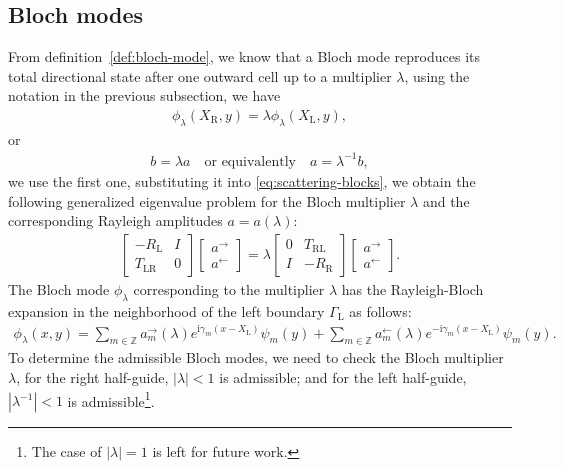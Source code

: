 \documentclass[11pt,fleqn]{article}
\newcommand{\ii}{\mathrm{i}}
\theoremstyle{definition}
\theoremstyle{remark}
\begin{document}
\subsection{Bloch modes}
From definition~\ref{def:bloch-mode}, we know that a Bloch mode reproduces its total directional state after one outward cell up to a multiplier $\lambda$, using the notation in the previous subsection, we have
\begin{align*}
  \phi_\lambda(X_\mathrm{R}, y) = \lambda \phi_\lambda(X_\mathrm{L},y),
\end{align*}
or \begin{align*}
  b = \lambda a \quad \text{or equivalently}\quad a = \lambda^{-1} b,
\end{align*}
we use the first one, substituting it into \eqref{eq:scattering-blocks}, we obtain
the following generalized eigenvalue problem for the Bloch multiplier $\lambda$ and the corresponding Rayleigh amplitudes $a = a(\lambda)$:
\begin{align}
  \begin{bmatrix}
    -R_\mathrm{L} & I \\ T_\mathrm{LR} & 0
  \end{bmatrix}\begin{bmatrix}
    a^\rightarrow \\ a^\leftarrow
  \end{bmatrix}
   = \lambda \begin{bmatrix}
    0 & T_\mathrm{RL} \\ I & -R_\mathrm{R}
  \end{bmatrix}\begin{bmatrix}
    a^\rightarrow \\ a^\leftarrow
  \end{bmatrix}.
\end{align}
The Bloch mode $\phi_\lambda$ corresponding to the multiplier $\lambda$ has the Rayleigh-Bloch expansion in the neighborhood of the left boundary $\Gamma_\mathrm{L}$ as follows:
\begin{align*}
  \phi_\lambda(x,y) = \sum_{m\in\mathbb{Z}} a_m^\rightarrow(\lambda) e^{\ii \gamma_m (x - X_\mathrm{L})} \psi_m(y) + \sum_{m\in\mathbb{Z}} a_m^\leftarrow(\lambda) e^{-\ii \gamma_m (x - X_\mathrm{L})} \psi_m(y).
\end{align*}
To determine the admissible Bloch modes, we need to check the Bloch multiplier $\lambda$,
for the right half-guide, $|\lambda| < 1$ is admissible; and for the left half-guide, $|\lambda^{-1}| < 1$ is admissible\footnote{The case of $|\lambda| = 1$ is left for future work.}. 
\end{document}
